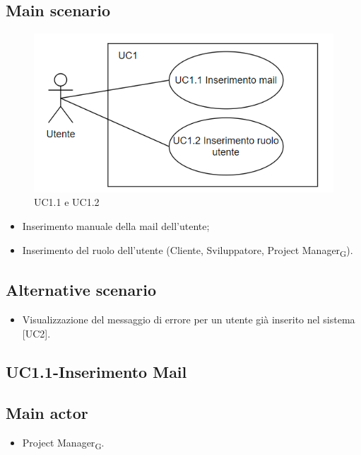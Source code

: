 \documentclass{article}
\begin{document}
    \subsection*{Main scenario}
   \begin{figure}[H]
      \centering
      \includegraphics{./imgUML/UC1-SOTTOCASI.png}
      \caption{UC1.1 e UC1.2}
      \label{fig:UC1,1 e UC1.2}
    \end{figure} 
        \begin{itemize}
            \item Inserimento manuale della mail dell'utente;
            \item Inserimento del ruolo dell'utente (Cliente, Sviluppatore, Project Manager\textsubscript{G}).
        \end{itemize}
    \subsection*{Alternative scenario}
        \begin{itemize}
            \item Visualizzazione del messaggio di errore per un utente già inserito nel sistema [UC2].
        \end{itemize}

\subsection{UC1.1-Inserimento Mail}
    
     \subsection*{Main actor}
         \begin{itemize}
             \item Project Manager\textsubscript{G}.
         \end{itemize}
\end{document}
